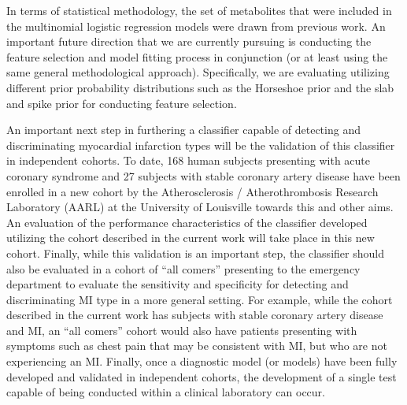 \begin{DoubleSpace*}
In terms of statistical methodology, the set of metabolites that were included in the multinomial logistic regression models were drawn from previous work. An important future direction that we are currently pursuing is conducting the feature selection and model fitting process in conjunction (or at least using the same general methodological approach). Specifically, we are evaluating utilizing different prior probability distributions such as the Horseshoe prior and the slab and spike prior for conducting feature selection. 

An important next step in furthering a classifier capable of detecting and discriminating myocardial infarction types will be the validation of this classifier in independent cohorts. To date, 168 human subjects presenting with acute coronary syndrome and 27 subjects with stable coronary artery disease have been enrolled in a new cohort by the Atherosclerosis / Atherothrombosis Research Laboratory (AARL) at the University of Louisville towards this and other aims. An evaluation of the performance characteristics of the classifier developed utilizing the cohort described in the current work will take place in this new cohort. Finally, while this validation is an important step, the classifier should also be evaluated in a cohort of ``all comers'' presenting to the emergency department to evaluate the sensitivity and specificity for detecting and discriminating MI type in a more general setting. For example, while the cohort described in the current work has subjects with stable coronary artery disease and MI, an ``all comers'' cohort would also have patients presenting with symptoms such as chest pain that may be consistent with MI, but who are not experiencing an MI. Finally, once a diagnostic model (or models) have been fully developed and validated in independent cohorts, the development of a single test capable of being conducted within a clinical laboratory can occur. 

\end{DoubleSpace*}
